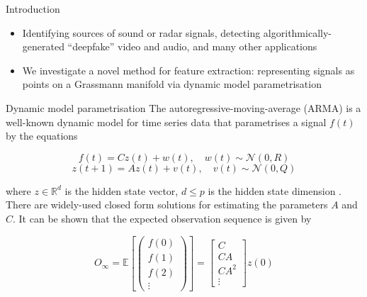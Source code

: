 \documentclass[final]{beamer}
\newlength{\onecolwid}
\begin{document}
\begin{frame}[t]
\begin{columns}[t]
\begin{column}{\onecolwid}
\begin{block}{Introduction}
\begin{itemize}
        \item Identifying sources of sound or radar signals, detecting algorithmically-generated
            ``deepfake'' video and audio, and many other applications

        \item We investigate a novel method for feature extraction: representing signals as points
            on a Grassmann manifold via dynamic model parametrisation
    \end{itemize}
\end{block}


\begin{block}{Dynamic model parametrisation}
    The autoregressive-moving-average (ARMA) is a well-known dynamic model for time series data that
    parametrises a signal $f(t)$ by the equations

    \begin{equation}
        f(t) = Cz(t) + w(t), \quad w(t) \sim \mathcal{N}(0, R)
    \end{equation}
    \begin{equation}
        z(t + 1) = Az(t) + v(t), \quad v(t) \sim \mathcal{N}(0, Q)
    \end{equation}

    where $z \in \mathbb{R}^d$ is the hidden state vector, $d \leq p$ is the hidden state dimension
    \cite{turaga_statistical_2011}. There are widely-used closed form solutions for estimating the
    parameters $A$ and $C$. It can be shown that the expected observation sequence is given by

    \begin{equation}\label{eq:observation}
        O_\infty = \mathbb{E}\left[\begin{pmatrix} f(0) \\ f(1) \\ f(2) \\ \vdots
            \end{pmatrix}\right] = \begin{bmatrix} C \\ CA \\ CA^2 \\ \vdots \end{bmatrix} z(0)
    \end{equation}
\end{block}


\end{column}
\end{columns}
\end{frame}
\end{document}
